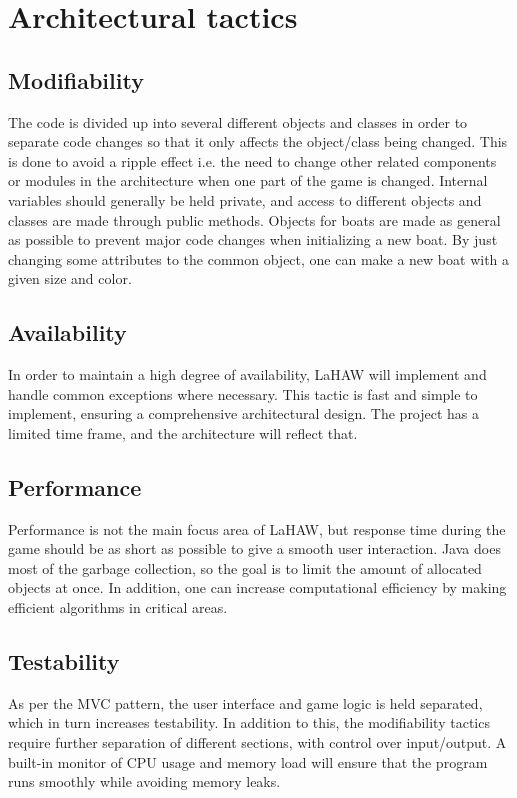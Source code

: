 \chapter{Architectural tactics}

    \section{Modifiability}
    The code is divided up into several different objects and classes in order to separate code changes so that it only affects the object/class being changed. This is done to avoid a ripple effect i.e. the need to change other related components or modules in the architecture when one part of the game is changed\cite[p.~107]{pensum}. Internal variables should generally be held private, and access to different objects and classes are made through public methods. Objects for boats are made as general as possible to prevent major code changes when initializing a new boat. By just changing some attributes to the common object, one can make a new boat with a given size and color. 
    
    \section{Availability}
    \label{avail}
    In order to maintain a high degree of availability, LaHAW will implement and handle common exceptions where necessary. This tactic is fast and simple to implement, ensuring a comprehensive architectural design. The project has a limited time frame, and the architecture will reflect that.
    
    \section{Performance}
    Performance is not the main focus area of LaHAW, but response time during the game should be as short as possible to give a smooth user interaction. Java does most of the garbage collection, so the goal is to limit the amount of allocated objects at once. In addition, one can increase computational efficiency by making efficient algorithms in critical areas. 
    
    \section{Testability}
    \label{test}
    As per the MVC pattern, the user interface and game logic is held separated, which in turn increases testability. In addition to this, the modifiability tactics require further separation of different sections, with control over input/output. A built-in monitor of CPU usage and memory load will ensure that the program runs smoothly while avoiding memory leaks.
    
